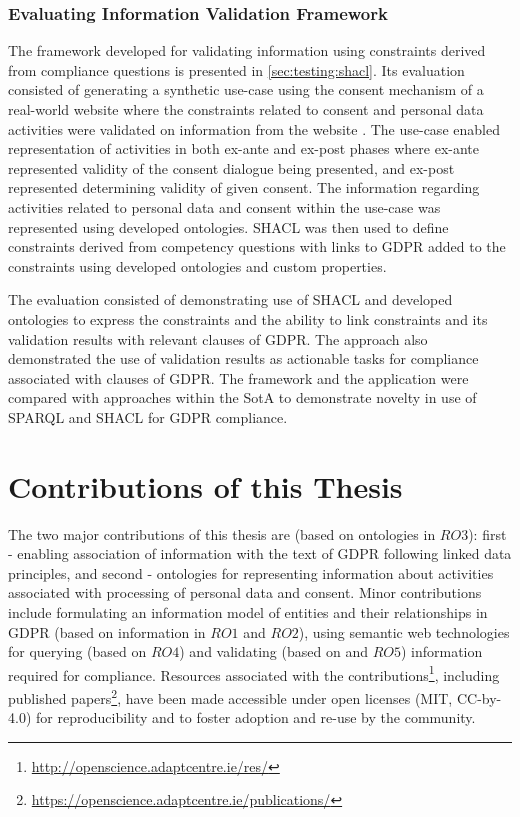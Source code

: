 \subsubsection{Evaluating Information Validation Framework}
The framework developed for validating information using constraints derived from compliance questions is presented in \autoref{sec:testing:shacl}.
Its evaluation consisted of generating a synthetic use-case using the consent mechanism of a real-world website where the constraints related to consent and personal data activities were validated on information from the website .
The use-case enabled representation of activities in both ex-ante and ex-post phases where ex-ante represented validity of the consent dialogue being presented, and ex-post represented determining validity of given consent.
The information regarding activities related to personal data and consent within the use-case was represented using developed ontologies.
SHACL was then used to define constraints derived from competency questions with links to GDPR added to the constraints using developed ontologies and custom properties.

The evaluation consisted of demonstrating use of SHACL and developed ontologies to express the constraints and the ability to link constraints and its validation results with relevant clauses of GDPR.
The approach also demonstrated the use of validation results as actionable tasks for compliance associated with clauses of GDPR.
The framework and the application were compared with approaches within the SotA to demonstrate novelty in use of SPARQL and SHACL for GDPR compliance.

\section{Contributions of this Thesis}\label{sec:intro:contributions}
The two major contributions of this thesis are (based on ontologies in $RO3$): first - enabling association of information with the text of GDPR following linked data principles, and second - ontologies for representing information about activities associated with processing of personal data and consent. Minor contributions include formulating an information model of entities and their relationships in GDPR (based on information in $RO1$ and $RO2$), using semantic web technologies for querying (based on $RO4$) and validating (based on and $RO5$) information required for compliance. Resources associated with the contributions\footnote{\url{http://openscience.adaptcentre.ie/res/}}, including published papers\footnote{\url{https://openscience.adaptcentre.ie/publications/}}, have been made accessible under open licenses (MIT,  CC-by-4.0) for reproducibility and to foster adoption and re-use by the community.

